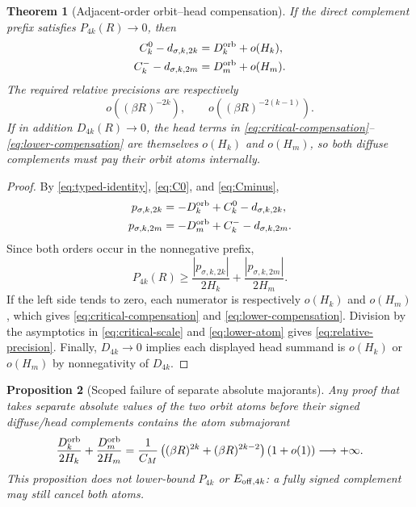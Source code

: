 \documentclass[11pt]{article}
\newtheorem{theorem}{Theorem}[section]
\newtheorem{proposition}[theorem]{Proposition}
\theoremstyle{remark}
\begin{document}
\begin{theorem}[Adjacent-order orbit--head compensation]
\label{thm:two-order}
If the direct complement prefix satisfies $P_{4k}(R)\to0$, then
\begin{align}
 C_k^0-d_{\sigma,k,2k}
 &=D_k^{\rm orb}+o(H_k),
 \label{eq:critical-compensation}\\
 C_k^- -d_{\sigma,k,2m}
 &=D_m^{\rm orb}+o(H_m).
 \label{eq:lower-compensation}
\end{align}
The required relative precisions are respectively
\begin{equation}\label{eq:relative-precision}
 o\!\left((\beta R)^{-2k}\right),
 \qquad
 o\!\left((\beta R)^{-2(k-1)}\right).
\end{equation}
If in addition $D_{4k}(R)\to0$, the head terms in
\eqref{eq:critical-compensation}--\eqref{eq:lower-compensation} are
themselves $o(H_k)$ and $o(H_m)$, so both diffuse complements must pay their
orbit atoms internally.
\end{theorem}

\begin{proof}
By \eqref{eq:typed-identity}, \eqref{eq:C0}, and \eqref{eq:Cminus},
\begin{align*}
 p_{\sigma,k,2k}&=-D_k^{\rm orb}+C_k^0-d_{\sigma,k,2k},\\
 p_{\sigma,k,2m}&=-D_m^{\rm orb}+C_k^- -d_{\sigma,k,2m}.
\end{align*}
Since both orders occur in the nonnegative prefix,
\begin{equation}\label{eq:two-term-lower}
 P_{4k}(R)\ge
 \frac{|p_{\sigma,k,2k}|}{2H_k}
 +\frac{|p_{\sigma,k,2m}|}{2H_m}.
\end{equation}
If the left side tends to zero, each numerator is respectively $o(H_k)$ and
$o(H_m)$, which gives \eqref{eq:critical-compensation} and
\eqref{eq:lower-compensation}.  Division by the asymptotics in
\eqref{eq:critical-scale} and \eqref{eq:lower-atom} gives
\eqref{eq:relative-precision}.  Finally, $D_{4k}\to0$ implies each displayed
head summand is $o(H_k)$ or $o(H_m)$ by nonnegativity of $D_{4k}$.
\end{proof}

\begin{proposition}[Scoped failure of separate absolute majorants]
\label{prop:absolute}
Any proof that takes separate absolute values of the two orbit atoms before
their signed diffuse/head complements contains the atom submajorant
\begin{equation}\label{eq:majorant}
 \frac{D_k^{\rm orb}}{2H_k}+\frac{D_m^{\rm orb}}{2H_m}
 =\frac1{C_M}\left((\beta R)^{2k}+(\beta R)^{2k-2}\right)(1+o(1))
 \longrightarrow+\infty.
 \end{equation}
This proposition does not lower-bound $P_{4k}$ or $E_{{\rm off},4k}$: a
fully signed complement may still cancel both atoms.
\end{proposition}
\end{document}
